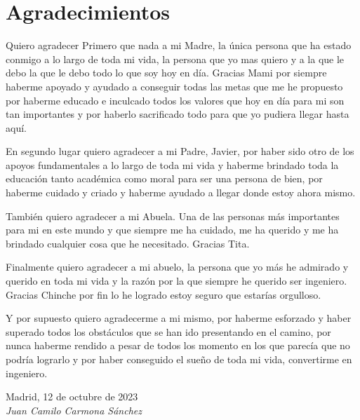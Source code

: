 \cleardoublepage

\chapter*{Agradecimientos}

Quiero agradecer Primero que nada a mi Madre, la única persona que ha estado conmigo a lo largo de toda mi vida, la persona que yo mas quiero y a la que le debo la que le debo todo lo que soy hoy en día. Gracias Mami por siempre haberme apoyado y ayudado a conseguir todas las metas que me he propuesto por haberme educado e inculcado todos los valores que hoy en día para mi son tan importantes y por haberlo sacrificado todo para que yo pudiera llegar hasta aquí.

\bigskip

En segundo lugar quiero agradecer a mi Padre, Javier, por haber sido otro de los apoyos fundamentales a lo largo de toda mi vida y haberme brindado toda la educación tanto académica como moral para ser una persona de bien, por haberme cuidado y criado y haberme ayudado a llegar donde estoy ahora mismo.

\bigskip

También quiero agradecer a mi Abuela. Una de las personas más importantes para mi en este mundo y que siempre me ha cuidado, me ha querido y me ha brindado cualquier cosa que he necesitado. Gracias Tita.

\bigskip

Finalmente quiero agradecer a mi abuelo, la persona que yo más he admirado y querido en toda mi vida y la razón por la que siempre he querido ser ingeniero. Gracias Chinche por fin lo he logrado estoy seguro que estarías orgulloso.

\bigskip

Y por supuesto quiero agradecerme a mi mismo, por haberme esforzado y haber superado todos los obstáculos que se han ido presentando en el camino, por nunca haberme rendido a pesar de todos los momento en los que parecía que no podría lograrlo y por haber conseguido el sueño de toda mi vida, convertirme en ingeniero.
\bigskip

\begin{flushright}
		\par
		\vspace{1.0 cm}
		Madrid, 12 de octubre de 2023\\ %
		\emph{Juan Camilo Carmona Sánchez}
\end{flushright}

\thispagestyle{empty}